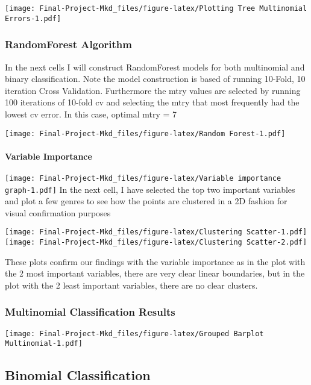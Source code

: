 \documentclass[
]{article}
\begin{document}
\texttt{[image: Final-Project-Mkd\_files/figure-latex/Plotting Tree Multinomial Errors-1.pdf]}

\hypertarget{randomforest-algorithm}{%
\subsubsection{RandomForest Algorithm}\label{randomforest-algorithm}}

In the next cells I will construct RandomForest models for both
multinomial and binary classification. Note the model construction is
based of running 10-Fold, 10 iteration Cross Validation. Furthermore the
mtry values are selected by running 100 iterations of 10-fold cv and
selecting the mtry that most frequently had the lowest cv error. In this
case, optimal mtry = 7

\texttt{[image: Final-Project-Mkd\_files/figure-latex/Random Forest-1.pdf]}

\hypertarget{variable-importance}{%
\paragraph{Variable Importance}\label{variable-importance}}

\texttt{[image: Final-Project-Mkd\_files/figure-latex/Variable importance graph-1.pdf]}
In the next cell, I have selected the top two important variables and
plot a few genres to see how the points are clustered in a 2D fashion
for visual confirmation purposes

\texttt{[image: Final-Project-Mkd\_files/figure-latex/Clustering Scatter-1.pdf]}
\texttt{[image: Final-Project-Mkd\_files/figure-latex/Clustering Scatter-2.pdf]}

These plots confirm our findings with the variable importance as in the
plot with the 2 most important variables, there are very clear linear
boundaries, but in the plot with the 2 least important variables, there
are no clear clusters.

\hypertarget{multinomial-classification-results}{%
\subsubsection{Multinomial Classification
Results}\label{multinomial-classification-results}}

\texttt{[image: Final-Project-Mkd\_files/figure-latex/Grouped Barplot Multinomial-1.pdf]}

\hypertarget{binomial-classification}{%
\subsection{\texorpdfstring{\textbf{Binomial
Classification}}{Binomial Classification}}\label{binomial-classification}}
\end{document}

